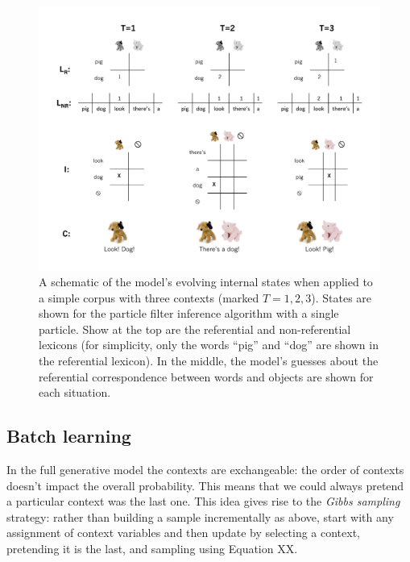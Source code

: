 \documentclass[man,noapacite,12pt]{apa2}
\begin{document}
\begin{figure}[H]
\begin{center}
\includegraphics[width=6.25in]{figures/inference_diagram.pdf}
\caption{\label{fig:inference_diagram} A schematic of the model's evolving internal states when applied to a simple corpus with three contexts (marked $T=1,2,3$). States are shown for the particle filter inference algorithm with a single particle. Show at the top are the referential and non-referential lexicons (for simplicity, only the words ``pig'' and ``dog'' are shown in the referential lexicon). In the middle, the model's guesses about the referential correspondence between words and objects are shown for each situation.}
\end{center}
\end{figure}



\subsection{Batch learning}

In the full generative model the contexts are exchangeable: the order of contexts doesn't impact the overall probability. This means that we could always pretend a particular context was the last one. This idea gives rise to the \emph{Gibbs sampling} strategy: rather than building a sample incrementally as above, start with any assignment of context variables and then update by selecting a context, pretending it is the last, and sampling using Equation XX.
\end{document}
